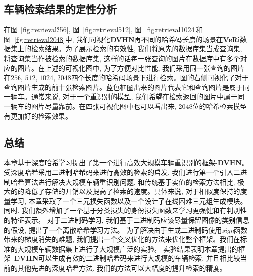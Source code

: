 \subsection{车辆检索结果的定性分析}
在图~\ref{fig:retrieval256}, 图~\ref{fig:retrieval512}, 图~\ref{fig:retrieval1024}和图~\ref{fig:retrieval2048}中, 我们可视化\textbf{DVHN}再不同的哈希码长度的场景在\textbf{VeRi}数据集上的检索结果。为了展示检索的有效性, 我们将原先的数据库集当成查询集, 将查询集当作被检索的数据库集, 这样的话每一张查询的图片在数据库中有多个对应的图片。在上述的可视化图中, 为了方便对比性能, 我们采用同一张查询的图片在$256$, $512$, $1024$, $2048$四个长度的哈希码场景下进行检索。图的右侧可视化了对于查询图片生成的前十张检索图片。蓝色框圈出来的图片代表它和查询图片是属于同一辆车。通常来说, 对于一个重识别的模型, 我们希望在检索返回的图片中属于同一辆车的图片尽量靠前。在四张可视化图中也可以看出来, $2048$位的哈希检索模型有更加好的检索效果。
\subsection{总结}
本章基于深度哈希学习提出了第一个进行高效大规模车辆重识别的框架-\textbf{DVHN}。受深度哈希采用二进制哈希码来进行高效的检索的启发, 我们进行第一个引入二进制哈希算法进行解决大规模车辆重识别问题, 和传统基于实值的检索方法相比, 极大的的降低了存储的开销以及提高了检索的速度。具体来说, 对于相似度保持的度量学习, 本章采取了一个三元损失函数以及一个设计了在线困难三元组生成模块。同时, 我们额外增加了一个基于分类损失的身份损失函数来学习更强健和有判别性的特征表示。 对于二进制码学习, 我们基于二进制码应该尽量保留图像的类别信息的假设, 提出了一个离散哈希学习方法。 为了解决由于生成二进制码使用\textit{sign}函数带来的梯度消失的难题, 我们提出一个交叉优化的方法来优化整个框架。我们在标准的大规模车辆数据集上进行了大规模广泛的实验。 实验结果表明本章提出的框架~\textbf{DVHN}可以生成有效的二进制哈希码来进行大规模的车辆检索, 并且相比较当前的其他先进的深度哈希方法, 我们的方法可以大幅度的提升检索的精度。

